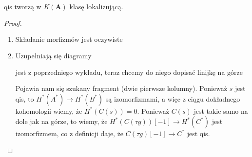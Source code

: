 \section{}

\begin{theorem}
  qis tworzą w $K(\mathbf{A})$ klasę lokalizującą.
\end{theorem}

\begin{proof}
  \begin{enumerate}
    \item Składanie morfizmów jest oczywiste
    \item Uzupełniają się diagramy
      \begin{center}\end{center}

      \begin{center}\end{center}
      jest z poprzedniego wykładu, teraz chcemy do niego dopisać linijkę na górze

      \begin{center}\end{center}

        Pojawia nam się szukany fragment (dwie pierwsze kolumny). Ponieważ $s$ jest qis, to $H^*(A^*)\to H^*(B^*)$ są izomorfizmami, a więc z ciągu dokładnego kohomologii wiemy, że $H^*(C(s))=0$. Ponieważ $C(s)$ jest takie samo na dole jak na górze, to wiemy, że $H^*(C(\tau g))[-1]\to H^*(C^*)$ jest izomorfizmem, co z definicji daje, że $C(\tau g)[-1]\to C^*$ jest qis.


\end{enumerate}
\end{proof}
